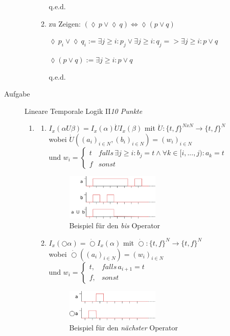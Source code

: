 \documentclass[a4paper,twoside,12pt]{article}
\newcounter{AUFGNR}
\newcommand{\AUFGABE}[2]{\vspace{0.3cm}\item[Aufgabe~\arabic{AUFGNR}]\stepcounter{AUFGNR} #1\hfill\emph{#2}}
\begin{document}
\begin{description}
\begin{enumerate}
\begin{enumerate}
q.e.d.

\item zu Zeigen: $(\lozenge\, p \vee \lozenge\, q) \Leftrightarrow \lozenge (p \vee q)$

$
\lozenge\, p_i \vee \lozenge\, q_i := \exists j \geq i: p_j \vee \exists j \geq i: q_j => \exists j \geq i: p \vee q
$

$
\lozenge (p \vee q) := \exists j \geq i: p \vee q
$

q.e.d.
\end{enumerate}
\end{enumerate}

\AUFGABE{Lineare Temporale Logik II}{10 Punkte}
\begin{enumerate}
\item
\begin{enumerate}
\item
$I_x(\alpha U \beta) = I_x(\alpha )\dot{U} I_x(\beta)$ mit $\dot{U}: \{t,f\}^{N x N} \rightarrow \{t,f\}^N$ \\
wobei $\dot{U}((a_i)_{i\in N}, (b_i)_{i\in N}) = (w_i)_{i\in N}$\\
und $w_i = \begin{cases} t & falls\, \exists j\geq i: b_j = t \land \forall k\in [i, ..., j): a_k = t \\ f & sonst \end{cases}$
\begin{figure}
  \includegraphics[width=0.5\textwidth]{2_a_1.png}
\caption{Beispiel für den \textit{bis} Operator}
\end{figure}

\item
$I_x(\bigcirc \alpha) = \dot{\bigcirc} I_x(\alpha )$ mit $\dot{\bigcirc}: \{t,f\}^N \rightarrow \{t,f\}^N$ \\
wobei $\dot{\bigcirc}((a_i)_{i\in N}) = (w_i)_{i\in N}$\\
und $w_i = \begin{cases}
 t, & falls\, a_{i+1} = t\\
 f, & sonst
 \end{cases}$
 	\begin{figure}
 	   \includegraphics[width=0.5\textwidth]{2_a_2.png}
	\caption{Beispiel für den \textit{nächster} Operator}
 	\end{figure}


\end{enumerate}
\end{enumerate}
\end{description}
\end{document}
